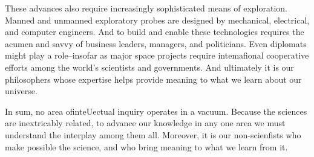 These advances also require increasingly sophisticated means of exploration.
Manned and unmanned exploratory probes are designed by mechanical, electrical, and computer engineers.
And to build and enable these technologies requires the acumen and savvy of business leaders, managers, and politicians.
Even diplomats might play a role--insofar as major space projects require intemafional cooperative efforts among the world's scientists and governments.
And ultimately it is our philosophers whose expertise helps provide meaning to what we learn about our universe.


In sum, no area ofinteUectual inquiry operates in a vacuum.
Because the sciences are inextricably related, to advance our knowledge in any one area we must understand the interplay among them all.
Moreover, it is our non-scienfists who make possible the science, and who bring meaning to what we learn from it.
